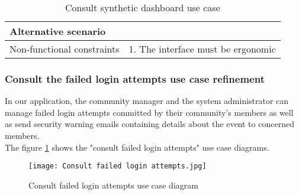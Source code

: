 \begin{table}[H]
\begin{tabular}{|ll|}
\multicolumn{1}{|l|}{Alternative scenario}       &                                                                                                                                                                           \\ \hline
\multicolumn{1}{|l|}{Non-functional constraints} & 1. The interface must be ergonomic                                                                                                                                        \\ \hline
\end{tabular}
\caption{Consult synthetic dashboard use case}
\label{dashboard_table}
\end{table}
\subsubsection{Consult the failed login attempts use case refinement}
In our application, the community manager and the system administrator can manage failed login attempts committed by their community's members as well as send security warning emails containing details about the event to concerned members.\\
The figure \ref{loginattempts_uc} shows the "consult failed login attempts" use case diagrams.
\begin{figure}[H]%
    \center   
    \texttt{[image: Consult failed login attempts.jpg]}
    \caption{Consult failed login attempts use case diagram}
    \label{loginattempts_uc}
\end{figure}

